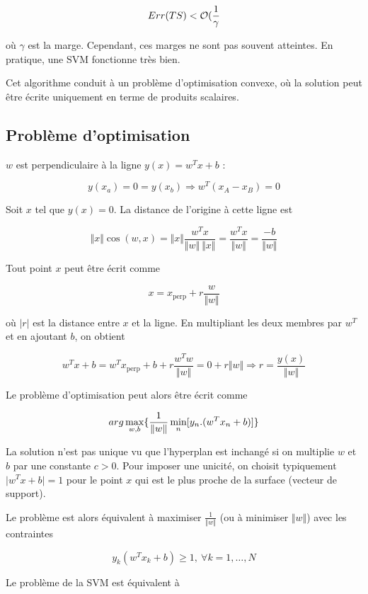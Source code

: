 	$$Err(TS) < \mathcal{O} (\frac{1}{\gamma}$$
	
	où $\gamma$ est la marge. Cependant, ces marges ne sont pas souvent atteintes. En pratique, une SVM fonctionne très bien.
	
	Cet algorithme conduit à un problème d'optimisation convexe, où la solution peut être écrite uniquement en terme de produits scalaires.
	
	\subsection{Problème d'optimisation}
	
	
	$w$ est perpendiculaire à la ligne $y(x) = w^Tx + b$ :
	
	$$y(x_a) = 0 = y(x_b) \Rightarrow w^T(x_A - x_B) = 0$$
	
	Soit $x$ tel que $y(x) = 0$. La distance de l'origine à cette ligne est
	
	$$\Vert x \Vert \cos(w, x) = \Vert x \Vert \frac{w^T x}{\Vert w \Vert \: \Vert x \Vert} = \frac{w^Tx}{\Vert w \Vert} = \frac{-b}{\Vert w \Vert}$$
	
	Tout point $x$ peut être écrit comme
	
	$$x = x_{\text{perp}} + r \frac{w}{\Vert w \Vert}$$
	
	où $\vert r \vert$ est la distance entre $x$ et la ligne. En multipliant les deux membres par $w^T$ et en ajoutant $b$, on obtient
	
	$$w^Tx + b = w^T x_{\text{perp}} + b + r \frac{w^T w}{\Vert w \Vert} = 0 + r \Vert w \Vert \Rightarrow r = \frac{y(x)}{\Vert w \Vert}$$
	
	Le problème d'optimisation peut alors être écrit comme 
	
	$$arg \max_{w, b} \lbrace \frac{1}{\Vert w \Vert} \min_n [y_n . (w^T x_n + b)] \rbrace$$
	
	La solution n'est pas unique vu que l'hyperplan est inchangé si  on multiplie $w$ et $b$ par une constante $c > 0$. Pour imposer une unicité, on choisit typiquement $\vert w^T x + b \vert = 1$ pour le point $x$ qui est le plus proche de la surface (vecteur de support).
	
	Le problème est alors équivalent à maximiser $\frac{1}{\Vert w \Vert}$ (ou à minimiser $\Vert w \Vert$) avec les contraintes
	
	$$y_k(w^T x_k + b) \geq 1, \: \forall k = 1, \dots , N$$
	
	Le problème de la SVM est équivalent à
	
